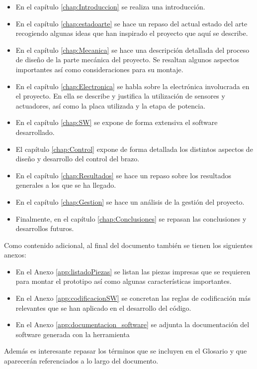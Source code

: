     \begin{itemize}
    \item En el capítulo \ref{chap:Introduccion} se realiza una introducción. \completar
    \item En el capítulo \ref{chap:estadoarte} se hace un repaso del actual estado del arte recogiendo algunas ideas que han inspirado el proyecto que aquí se describe.
    \item En el capítulo \ref{chap:Mecanica} se hace una descripción detallada del proceso de diseño de la parte mecánica del proyecto. Se resaltan algunos aspectos importantes así como consideraciones para su montaje.
    \item En el capítulo \ref{chap:Electronica} se habla sobre la electrónica involucrada en el proyecto. En ella se describe y justifica la utilización de sensores y actuadores, así como la placa utilizada y la etapa de potencia.
    \item En el capítulo \ref{chap:SW} se expone de forma extensiva el software desarrollado.
    \item El capítulo \ref{chap:Control} expone de forma detallada los distintos aspectos de diseño y desarrollo del control del brazo.
    \item En el capítulo \ref{chap:Resultados} se hace un repaso sobre los resultados generales a los que se ha llegado.
    \item En el capítulo \ref{chap:Gestion} se hace un análisis de la gestión del proyecto.
    \item Finalmente, en el capítulo \ref{chap:Conclusiones} se repasan las conclusiones y desarrollos futuros.
    \end{itemize}
    
    Como contenido adicional, al final del documento también se tienen los siguientes anexos:
    
    \begin{itemize}
    \item En el Anexo \ref{app:listadoPiezas} se listan las piezas impresas que se requieren para montar el prototipo así como algunas características importantes.
    \item En el Anexo \ref{app:codificacionSW} se concretan las reglas de codificación más relevantes que se han aplicado en el desarrollo del código.
    \item En el Anexo \ref{app:documentacion_software} se adjunta la documentación del software generada con la herramienta 
    \end{itemize}
    
    Además es interesante repasar los términos que se incluyen en el Glosario y que aparecerán referenciados a lo largo del documento.

